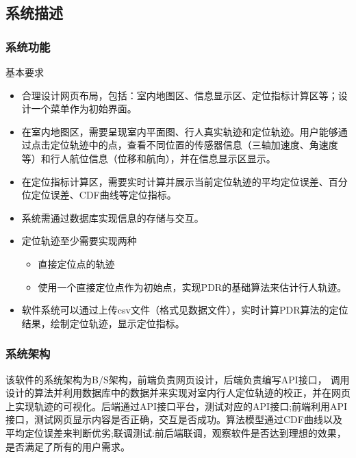 \documentclass[a4paper]{article}
\begin{document}
\subsection{系统描述}
\subsubsection{系统功能}
基本要求
\begin{itemize}
    \item 合理设计网页布局，包括：室内地图区、信息显示区、定位指标计算区等；设计一个菜单作为初始界面。
    \item 在室内地图区，需要呈现室内平面图、行人真实轨迹和定位轨迹。用户能够通过点击定位轨迹中的点，查看不同位置的传感器信息（三轴加速度、角速度等）和行人航位信息（位移和航向），并在信息显示区显示。
    \item 在定位指标计算区，需要实时计算并展示当前定位轨迹的平均定位误差、百分位定位误差、CDF曲线等定位指标。
    \item 系统需通过数据库实现信息的存储与交互。
    \item 定位轨迹至少需要实现两种
        \begin{itemize}
        \item 直接定位点的轨迹
        \item 使用一个直接定位点作为初始点，实现PDR的基础算法来估计行人轨迹。
        \end{itemize}
    \item 软件系统可以通过上传csv文件（格式见数据文件），实时计算PDR算法的定位结果，绘制定位轨迹，显示定位指标。
\end{itemize}
\subsubsection{系统架构}
该软件的系统架构为B/S架构，前端负责网页设计，后端负责编写API接口， 调用设计的算法并利用数据库中的数据并来实现对室内行人定位轨迹的校正，并在网页上实现轨迹的可视化。后端通过API接口平台，测试对应的API接口;前端利用API接口，测试网页显示内容是否正确，交互是否成功。算法模型通过CDF曲线以及平均定位误差来判断优劣;联调测试:前后端联调，观察软件是否达到理想的效果，是否满足了所有的用户需求。
\end{document}
